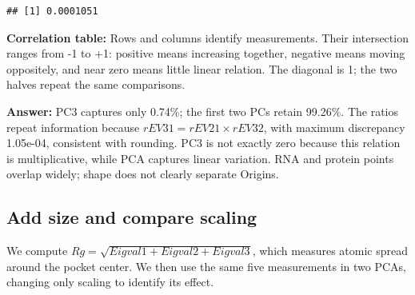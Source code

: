 \documentclass[
  10pt,
]{article}
\newenvironment{Shaded}{\begin{snugshade}}{\end{snugshade}}
\newcommand{\FunctionTok}[1]{\textcolor[rgb]{0.13,0.29,0.53}{\textbf{#1}}}
\newcommand{\NormalTok}[1]{#1}
\newcommand{\OtherTok}[1]{\textcolor[rgb]{0.56,0.35,0.01}{#1}}
\newcommand{\SpecialCharTok}[1]{\textcolor[rgb]{0.81,0.36,0.00}{\textbf{#1}}}
\begin{document}
\begin{Shaded}
\end{Shaded}

\begin{verbatim}
## [1] 0.0001051
\end{verbatim}

\textbf{Correlation table:} Rows and columns identify measurements.
Their intersection ranges from -1 to +1: positive means increasing
together, negative means moving oppositely, and near zero means little
linear relation. The diagonal is 1; the two halves repeat the same
comparisons.

\textbf{Answer:} PC3 captures only 0.74\%; the first two PCs retain
99.26\%. The ratios repeat information because
\(rEV31=rEV21\times rEV32\), with maximum discrepancy 1.05e-04,
consistent with rounding. PC3 is not exactly zero because this relation
is multiplicative, while PCA captures linear variation. RNA and protein
points overlap widely; shape does not clearly separate Origins.

\subsection{Add size and compare
scaling}\label{add-size-and-compare-scaling}

We compute \(Rg=\sqrt{Eigval1+Eigval2+Eigval3}\), which measures atomic
spread around the pocket center. We then use the same five measurements
in two PCAs, changing only scaling to identify its effect.
\end{document}
